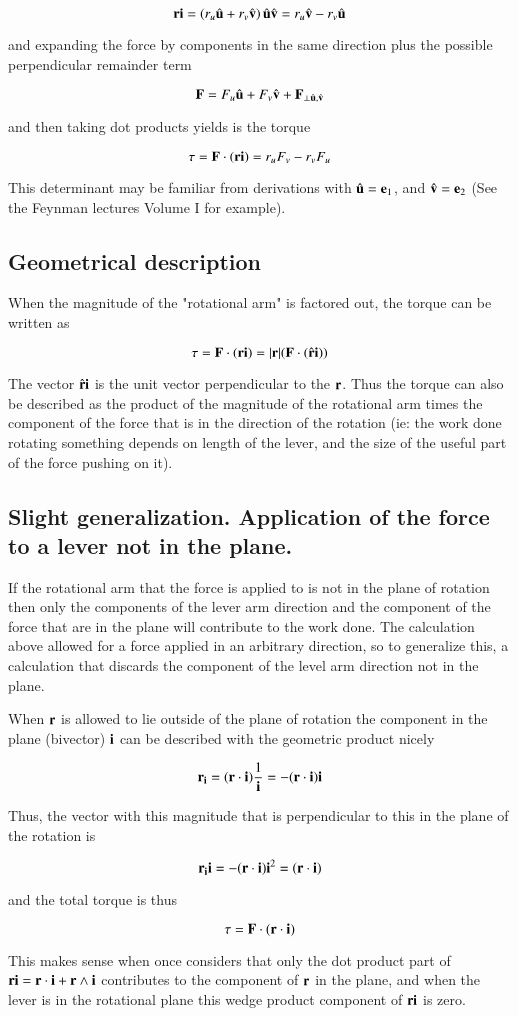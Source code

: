 \documentclass{article}      %
\begin{document}
\[
\mathbf{r} \mathbf{i} =
\left(
r_u \hat{\mathbf{u}} + r_v \hat{\mathbf{v}}
\right)
\hat{\mathbf{u}} \hat{\mathbf{v}}
= 
r_u \hat{\mathbf{v}}  
- r_v \hat{\mathbf{u}}
\]

and expanding the force by components in the same direction plus the possible perpendicular remainder term

\[
\mathbf{F}  = F_u \hat{\mathbf{u}} + F_v \hat{\mathbf{v}} + \mathbf{F} _{\perp \hat{\mathbf{u}},\hat{\mathbf{v}}}
\]

and then taking dot products yields is the torque

\[
\tau = \mathbf{F} \cdot (\mathbf{r}  \mathbf{i} ) = r_u F_v - r_v F_u
\]

This determinant may be familiar from derivations with $\hat{\mathbf{u}} = \mathbf{e} _1$, and $\hat{\mathbf{v}} = \mathbf{e} _2$ (See the Feynman lectures Volume I for example).

\subsection{Geometrical description }

When the magnitude of the "rotational arm" is factored out, the torque can be written as

\[
\tau = \mathbf{F} \cdot (\mathbf{r}  \mathbf{i} ) = |\mathbf{r} |  (\mathbf{F} \cdot (\hat{\mathbf{r}} \mathbf{i} ))
\]

The vector $\hat{\mathbf{r}} \mathbf{i} $ is the unit vector perpendicular to the $\mathbf{r}$.  Thus the torque can also be described as the product of the magnitude of the rotational arm times the component of the force that is in the direction of the rotation (ie: the work done rotating something depends on length of the lever, and the size of the useful part of the force pushing on it).

\subsection{Slight generalization.  Application of the force to a lever not in the plane. }

If the rotational arm that the force is applied to is not in the plane of rotation then only the components of the lever arm direction and the component of the force that are in the plane will contribute to the work done.  The calculation above allowed for a force applied in an arbitrary direction, so to generalize this, a calculation that discards the component of the level arm direction not in the plane.

When $\mathbf{r} $ is allowed to lie outside of the plane of rotation the component in the plane (bivector) $\mathbf{i} $ can be described with the geometric product nicely

\[
\mathbf{r} _{\mathbf{i} } =  (\mathbf{r}  \cdot \mathbf{i} ) \frac{1}{\mathbf{i} } =  -(\mathbf{r}  \cdot \mathbf{i} ) \mathbf{i} 
\]

Thus, the vector with this magnitude that is perpendicular to this in the plane of the rotation  is

\[
\mathbf{r} _{\mathbf{i} } \mathbf{i}  
=  -(\mathbf{r}  \cdot \mathbf{i} ) \mathbf{i} ^2
=  (\mathbf{r}  \cdot \mathbf{i} ) 
\]

and the total torque is thus

\[
\tau
=  \mathbf{F}  \cdot (\mathbf{r}  \cdot \mathbf{i} ) 
\]

This makes sense when once considers that only the dot product part of $\mathbf{r}  \mathbf{i}  = \mathbf{r}  \cdot \mathbf{i}  + \mathbf{r}  \wedge \mathbf{i} $ contributes to the component of $\mathbf{r} $ in the plane, and when the lever is in the rotational plane this wedge product component of 
$\mathbf{r} \mathbf{i} $ is zero.
\end{document}
